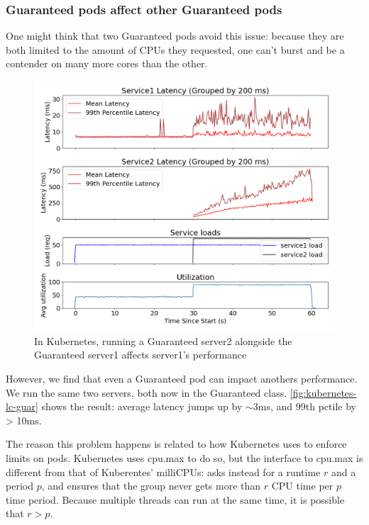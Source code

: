 \subsubsection{Guaranteed pods affect other Guaranteed pods}

One might think that two Guaranteed pods avoid this issue: because they are both
limited to the amount of CPUs they requested, one can't burst and be a contender
on many more cores than the other.

\begin{figure}[t]
    \centering
    \includegraphics[width=\columnwidth]{graphs/kubernetes-lc-guar.png}
    \caption{In Kubernetes, running a Guaranteed server2 alongside the
    Guaranteed server1 affects server1's
    performance}\label{fig:kubernetes-lc-guar}
\end{figure}

However, we find that even a Guaranteed pod can impact anothers performance. We
run the same two servers, both now in the Guaranteed class.
\autoref{fig:kubernetes-lc-guar} shows the result: average latency jumps up by
$\sim$3ms, and 99th pctile by > 10ms.

The reason this problem happens is related to how Kubernetes uses \cgroups{} to
enforce limits on pods. Kubernetes uses cpu.max to do so, but the interface to
\cgroups{} cpu.max is different from that of Kuberentes' milliCPUs: \cgroups{}
asks instead for a runtime $r$ and a period $p$, and ensures that the group
never gets more than $r$ CPU time per $p$ time period. Because multiple threads
can run at the same time, it is possible that $r>p$.

